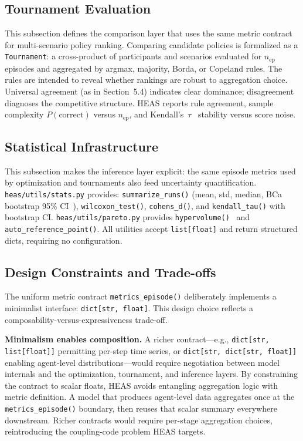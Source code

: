 \documentclass{wscpaperproc}
\begin{document}
\subsection{Tournament Evaluation}

This subsection defines the comparison layer that uses the same metric contract
for multi-scenario policy ranking. Comparing candidate policies is formalized as a \texttt{Tournament}: a
cross-product of participants and scenarios evaluated for $n_\text{ep}$
episodes and aggregated by argmax, majority, Borda, or Copeland rules. The
rules are intended to reveal whether rankings are robust to aggregation choice.
Universal agreement (as in Section~5.4) indicates clear dominance;
disagreement diagnoses the competitive structure.
HEAS reports rule agreement, sample complexity $P(\text{correct})$ versus
$n_\text{ep}$, and Kendall's~$\tau$~\cite{kendall1938new} stability versus
score noise.

\subsection{Statistical Infrastructure}

This subsection makes the inference layer explicit: the same episode metrics
used by optimization and tournaments also feed uncertainty quantification.
\texttt{heas/utils/stats.py} provides: \texttt{summarize\_runs()} (mean, std,
median, BCa bootstrap 95\% CI~\cite{efron1994bootstrap}),
\texttt{wilcoxon\_test()}, \texttt{cohens\_d()}, and \texttt{kendall\_tau()}
with bootstrap CI. \texttt{heas/utils/pareto.py} provides
\texttt{hypervolume()}~\cite{zitzler1998hypervolume} and
\texttt{auto\_reference\_point()}. All utilities accept \texttt{list[float]}
and return structured dicts, requiring no configuration.

\subsection{Design Constraints and Trade-offs}
\label{sec:design-constraints}

The uniform metric contract \texttt{metrics\_episode()} deliberately implements
a minimalist interface: \texttt{dict[str, float]}. This design choice reflects a
composability-versus-expressiveness trade-off.

\textbf{Minimalism enables composition.} A richer contract---e.g.,
\texttt{dict[str, list[float]]} permitting per-step time series, or
\texttt{dict[str, dict[str, float]]} enabling agent-level distributions---would
require negotiation between model internals and the optimization, tournament, and
inference layers. By constraining the contract to scalar floats, HEAS avoids
entangling aggregation logic with metric definition. A model that produces
agent-level data aggregates once at the \texttt{metrics\_episode()} boundary, then
reuses that scalar summary everywhere downstream. Richer contracts would require
per-stage aggregation choices, reintroducing the coupling-code problem HEAS targets.
\end{document}
